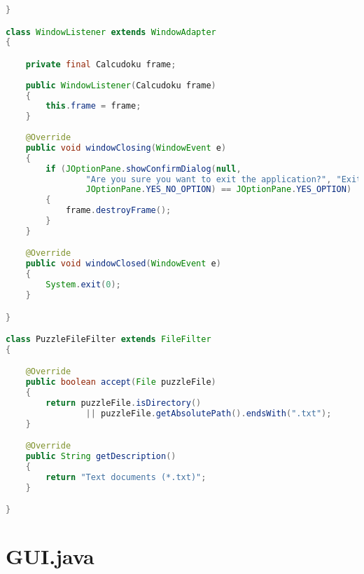 \begin{lstlisting}[language=Java,basicstyle=\tiny,caption=Calcudoku.java]
}

class WindowListener extends WindowAdapter
{

    private final Calcudoku frame;
    
    public WindowListener(Calcudoku frame)
    {
        this.frame = frame;
    }
    
    @Override
    public void windowClosing(WindowEvent e)
    {
        if (JOptionPane.showConfirmDialog(null,
                "Are you sure you want to exit the application?", "Exit", 
                JOptionPane.YES_NO_OPTION) == JOptionPane.YES_OPTION)
        {
            frame.destroyFrame();
        }
    }

    @Override
    public void windowClosed(WindowEvent e)
    {
        System.exit(0);
    }

}

class PuzzleFileFilter extends FileFilter
{

    @Override
    public boolean accept(File puzzleFile)
    {
        return puzzleFile.isDirectory() 
                || puzzleFile.getAbsolutePath().endsWith(".txt");
    }

    @Override
    public String getDescription()
    {
        return "Text documents (*.txt)";
    }

}
\end{lstlisting}

\section{GUI.java}
\label{sec:kodeprogramgui}

